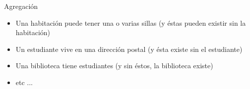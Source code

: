 \documentclass[10pt,envcountsect,spanish]{beamer}
\begin{document}
\begin{frame}[fragile]{Agregación}
\begin{itemize}
\begin{itemize}
\item Una habitación puede tener una o varias sillas (y éstas pueden existir sin la habitación)

\item Un estudiante vive en una dirección postal (y ésta existe sin el estudiante)

\item Una biblioteca tiene estudiantes (y sin éstos, la biblioteca existe)

\item etc ...
\end{itemize}


\end{itemize}

\end{frame}
\end{document}
